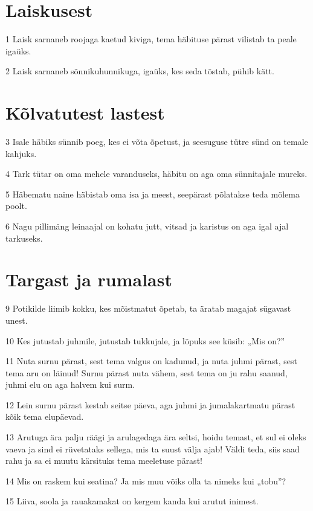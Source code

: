 \section*{Laiskusest}

\par 1 Laisk sarnaneb roojaga kaetud kiviga, tema häbituse pärast vilistab ta peale igaüks.
\par 2 Laisk sarnaneb sõnnikuhunnikuga, igaüks, kes seda tõstab, pühib kätt.

\section*{Kõlvatutest lastest}

\par 3 Isale häbiks sünnib poeg, kes ei võta õpetust, ja seesuguse tütre sünd on temale kahjuks.
\par 4 Tark tütar on oma mehele varanduseks, häbitu on aga oma sünnitajale mureks.
\par 5 Häbematu naine häbistab oma isa ja meest, seepärast põlatakse teda mõlema poolt.
\par 6 Nagu pillimäng leinaajal on kohatu jutt, vitsad ja karistus on aga igal ajal tarkuseks.

\section*{Targast ja rumalast}

\par 9 Potikilde liimib kokku, kes mõistmatut õpetab, ta äratab magajat sügavast unest.
\par 10 Kes jutustab juhmile, jutustab tukkujale, ja lõpuks see küsib: „Mis on?”
\par 11 Nuta surnu pärast, sest tema valgus on kadunud, ja nuta juhmi pärast, sest tema aru on läinud! Surnu pärast nuta vähem, sest tema on ju rahu saanud, juhmi elu on aga halvem kui surm.
\par 12 Lein surnu pärast kestab seitse päeva, aga juhmi ja jumalakartmatu pärast kõik tema elupäevad.
\par 13 Arutuga ära palju räägi ja arulagedaga ära seltsi, hoidu temast, et sul ei oleks vaeva ja sind ei rüvetataks sellega, mis ta suust välja ajab! Väldi teda, siis saad rahu ja sa ei muutu kärsituks tema meeletuse pärast!
\par 14 Mis on raskem kui seatina? Ja mis muu võiks olla ta nimeks kui „tobu”?
\par 15 Liiva, soola ja rauakamakat on kergem kanda kui arutut inimest.

